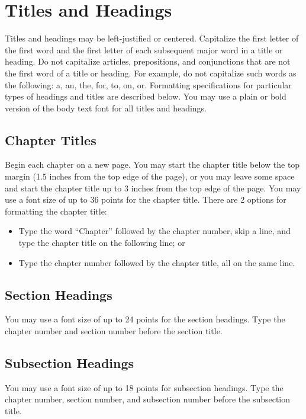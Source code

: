 \section{Titles and Headings}

Titles and headings may be left-justified or centered.  Capitalize the first
letter of the first word and the first letter of each subsequent major word in
a title or heading.  Do not capitalize articles, prepositions, and conjunctions
that are not the first word of a title or heading.  For example, do not
capitalize such words as the following: a, an, the, for, to, on, or.
Formatting specifications for particular types of headings and titles are
described below.  You may use a plain or bold version of the body text font for
all titles and headings.

\subsection{Chapter Titles}

Begin each chapter on a new page.  You may start the chapter title below the
top margin  (1.5 inches from the top edge of the page), or you may leave some
space and start the chapter title up to 3 inches from the top edge of the page.
You may use a font size of up to 36 points for the chapter title.  There are 2
options for formatting the chapter title:
\begin{itemize}
\item Type the word ``Chapter'' followed by the chapter number, skip a
  line, and type the chapter title on the following line; or
\item Type the chapter number followed by the chapter title, all on
  the same line.
\end{itemize}

\subsection{Section Headings}

You may use a font size of up to 24 points for the section headings.  Type the
chapter number and section number before the section title.

\subsection{Subsection Headings}

You may use a font size of up to 18 points for subsection headings.  Type the
chapter number, section number, and subsection number before the subsection
title.

